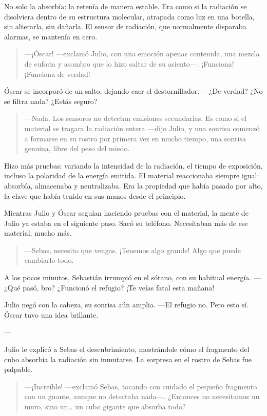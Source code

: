 \documentclass[a4paper,12pt]{book}
\begin{document}
No solo la absorbía: la retenía de manera estable. Era como si la radiación se disolviera dentro de su estructura molecular, atrapada como luz en una botella, sin alterarla, sin dañarla. El sensor de radiación, que normalmente disparaba alarmas, se mantenía en cero.

\begin{quote}
    —¡Óscar! —exclamó Julio, con una emoción apenas contenida, una mezcla de euforia y asombro que lo hizo saltar de su asiento—. ¡Funciona! ¡Funciona de verdad!
\end{quote}

Óscar se incorporó de un salto, dejando caer el destornillador. —¿De verdad? ¿No se filtra nada? ¿Estás seguro?

\begin{quote}
    —Nada. Los sensores no detectan emisiones secundarias. Es como si el material se tragara la radiación entera —dijo Julio, y una sonrisa comenzó a formarse en su rostro por primera vez en mucho tiempo, una sonrisa genuina, libre del peso del miedo.
\end{quote}

Hizo más pruebas: variando la intensidad de la radiación, el tiempo de exposición, incluso la polaridad de la energía emitida. El material reaccionaba siempre igual: absorbía, almacenaba y neutralizaba. Era la propiedad que había pasado por alto, la clave que había tenido en sus manos desde el principio.

Mientras Julio y Óscar seguían haciendo pruebas con el material, la mente de Julio ya estaba en el siguiente paso. Sacó su teléfono. Necesitaban más de ese material, mucho más.

\begin{quote}
    —Sebas, necesito que vengas. ¡Tenemos algo grande! Algo que puede cambiarlo todo.
\end{quote}

A los pocos minutos, Sebastián irrumpió en el sótano, con su habitual energía. —¿Qué pasó, bro? ¿Funcionó el refugio? ¡Te veías fatal esta mañana!

Julio negó con la cabeza, su sonrisa aún amplia. —El refugio no. Pero esto sí. Óscar tuvo una idea brillante.

---

Julio le explicó a Sebas el descubrimiento, mostrándole cómo el fragmento del cubo absorbía la radiación sin inmutarse. La sorpresa en el rostro de Sebas fue palpable.

\begin{quote}
    —¡Increíble! —exclamó Sebas, tocando con cuidado el pequeño fragmento con un guante, aunque no detectaba nada—. ¿Entonces no necesitamos un muro, sino un… un cubo gigante que absorba todo?
\end{quote}
\end{document}
